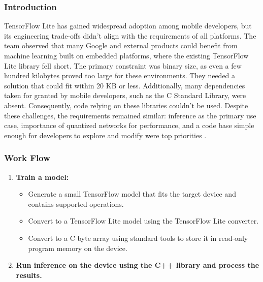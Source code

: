 \subsubsection{Introduction}
TensorFlow Lite has gained widespread adoption among mobile developers, but its engineering trade-offs didn't align with the requirements of all platforms. The team observed that many Google and external products could benefit from machine learning built on embedded platforms, where the existing TensorFlow Lite library fell short. The primary constraint was binary size, as even a few hundred kilobytes proved too large for these environments. They needed a solution that could fit within 20 KB or less. Additionally, many dependencies taken for granted by mobile developers, such as the C Standard Library, were absent. Consequently, code relying on these libraries couldn't be used. Despite these challenges, the requirements remained similar: inference as the primary use case, importance of quantized networks for performance, and a code base simple enough for developers to explore and modify were top priorities \cite{ten}.

\subsubsection{Work Flow}
\begin{enumerate}
	\item \textbf{Train a model:}
	\begin{itemize}
		\item Generate a small TensorFlow model that fits the target device and contains supported operations.
		\item Convert to a TensorFlow Lite model using the TensorFlow Lite converter.
		\item Convert to a C byte array using standard tools to store it in read-only program memory on the device.
	\end{itemize}
	\item \textbf{Run inference on the device using the C++ library and process the results.}
\end{enumerate}

